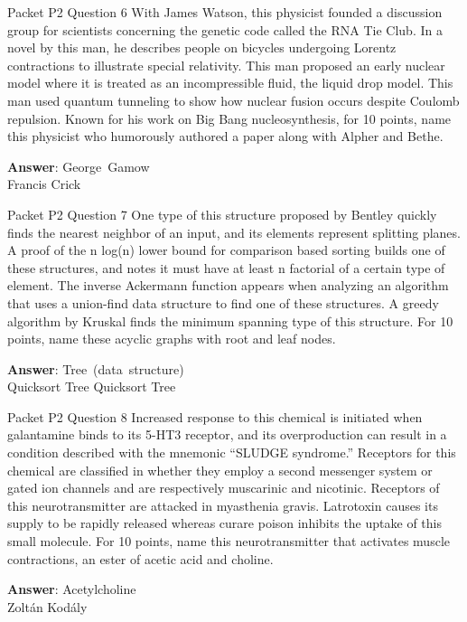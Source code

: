 \begin{frame}{Packet P2 Question 6}
With James Watson, this physicist founded   a discussion group for scientists concerning the genetic code called the RNA Tie Club. In a novel by this man, he describes people on bicycles undergoing Lorentz contractions to illustrate special relativity. This man proposed an early nuclear model where it is treated as an incompressible fluid, the liquid drop model. This man used quantum tunneling to show   how nuclear fusion occurs despite Coulomb repulsion. Known   for his work on Big Bang nucleosynthesis, for 10 points, name   this physicist who humorously authored a paper along with   Alpher and Bethe.

\textbf{Answer}: George\ Gamow\\
 Francis Crick
\end{frame}

\begin{frame}{Packet P2 Question 7}
One type of this structure proposed by Bentley quickly finds the nearest neighbor of an input, and its elements represent splitting planes. A proof of the n log(n)     lower bound for comparison based sorting builds one of these structures, and notes it must have at least n factorial of a certain type of element. The inverse Ackermann function appears when analyzing an algorithm that uses a union-find data structure to find one of these structures. A greedy algorithm by Kruskal finds the minimum spanning type of this structure. For 10 points, name these acyclic   graphs with root and leaf nodes.      

\textbf{Answer}: Tree\ (data\ structure)\\
 Quicksort
 Tree
 Quicksort
 Tree
\end{frame}

\begin{frame}{Packet P2 Question 8}
Increased response to this chemical is initiated when galantamine   binds to its 5-HT3 receptor, and its overproduction can result in a condition described with the mnemonic ``SLUDGE syndrome.'' Receptors for this chemical are   classified in whether they employ a second messenger system or gated ion channels and are respectively muscarinic and nicotinic.   Receptors   of this neurotransmitter   are attacked in myasthenia gravis. Latrotoxin causes its supply to be rapidly released whereas curare poison inhibits the uptake of this small molecule. For 10 points, name this neurotransmitter that activates muscle contractions, an ester of acetic acid and choline.

\textbf{Answer}: Acetylcholine\\
 Zoltán Kodály
\end{frame}


